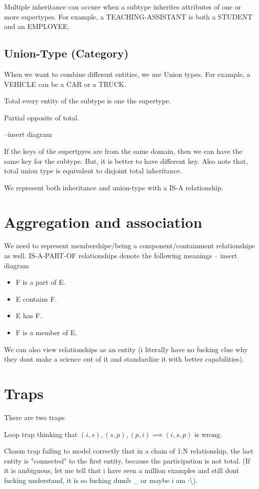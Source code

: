 Multiple inheritance can occure when a subtype inherites attributes of one or more supertypes. For example, a TEACHING-ASSISTANT is both a STUDENT and an EMPLOYEE.

\subsection{Union-Type (Category)}
When we want to combine different entities, we use Union types. For example, a VEHICLE can be a CAR or a  TRUCK. 
\begin{definition}
    \item [Total] every entity of the subtype is one the supertype.
    \item [Partial] opposite of total.
\end{definition}
--insert diagram 

If the keys of the supertpyes are from the same domain, then we can have the same key for the subtype. But, it is better to have different key. Also note that, total union type is equivalent to disjoint total inheritance. 

We represent both inheritance and union-type with a IS-A relationship. 

\section{Aggregation and association}
We need to represent membershipe/being a component/containment relationships as well. IS-A-PART-OF relationships denote the following meanings 
-- insert diagram
\begin{itemize}
    \item F is a part of E.
    \item E contains F.
    \item E has F.
    \item F is a member of E.
\end{itemize}

We can also view relationships as an entity (i literally have no fucking clue why they dont make a science out of it and standardize it with better capabilities).

\section{Traps}
There are two traps 
\begin{definition}
    \item [Loop trap] thinking that \((i,s), (s,p) , (p,i) \implies (i,s,p)\) is wrong.
    \item [Chasm trap] failing to model correctly that in a chain of 1:N relationship, the last entity is "connected" to the first entity, because the participation is not total. (If it is ambiguous, let me tell that i have seen a million examples and still dont fucking understand, it is so fucking dumb \_ or maybe i am :\textbackslash).
\end{definition}